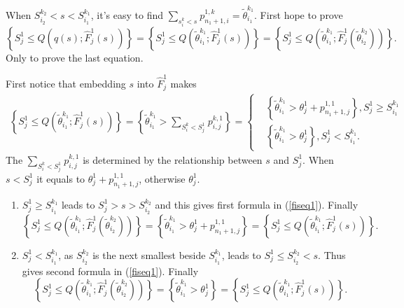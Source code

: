 \documentclass[12pt, a4paper, oneside]{article}
\begin{document}
    When $S_{i_2}^{k_2}<s<S_{i_1}^{k_1}$, it's easy to find $\overset{}{\underset{s_i^k<s}\sum}p_{n_1+1,i}^{1,k}=\tilde{\theta}_{i_1}^{k_1}$. First hope to prove
    \begin{equation}
        \left\{ S_j^1\leq Q(q(s);\hat{F}_j^1(s)) \right\}=\left\{ S_j^1\leq Q(\tilde{\theta}_{i_1}^{k_1};\hat{F}_j^1(s)) \right\}=\left\{ S_j^1\leq Q(\tilde{\theta}_{i_1}^{k_1};\hat{F}_j^1(\tilde{\theta}_{i_2}^{k_2})) \right\}.
    \end{equation}
    Only to prove the last equation.


    First notice that embedding $s$ into $\hat{F}_j^1$ makes
    \begin{gather}
        \left\{ S_j^1\leq Q(\tilde{\theta}_{i_1}^{k_1};\hat{F}_j^1(s)) \right\}=\left\{ \tilde{\theta}_{i_1}^{k_1}>\overset{}{\underset{S_i^k<S_j^1}\sum}p_{i,j}^{k,1} \right\}=\left\{
            \begin{aligned}
            &\left\{ \tilde{\theta}_{i_1}^{k_1}>\theta_j^1+p_{n_1+1,j}^{1,1} \right\},S_j^1\geq S_{i_1}^{k_1}\label{fiseq1}\\
            &\left\{ \tilde{\theta}_{i_1}^{k_1}>\theta_j^1 \right\},S_j^1<S_{i_1}^{k_1}.
            \end{aligned}
        \right.
    \end{gather}
    The $\overset{}{\underset{S_i^k<S_j^1}\sum}p_{i,j}^{k,1}$ is determined by the relationship between $s$ and $S_j^1$. When $s<S_j^1$ it equals to $\theta_j^1+p_{n_1+1,j}^{1,1}$, otherwise $\theta_j^1$.
    \begin{enumerate}
        \item $S_j^1\geq S_{i_1}^{k_1}$ leads to $S_j^1>s>S_{i_2}^{k_2}$ and this gives first formula in (\ref{fiseq1}). Finally
        \begin{equation*}
            \left\{ S_j^1\leq Q(\tilde{\theta}_{i_1}^{k_1};\hat{F}_j^1(\tilde{\theta}_{i_2}^{k_2})) \right\}=\left\{ \tilde{\theta}_{i_1}^{k_1}>\theta_j^1+p_{n_1+1,j}^{1,1} \right\}=\left\{ S_j^1\leq Q(\tilde{\theta}_{i_1}^{k_1};\hat{F}_j^1(s)) \right\}.
        \end{equation*}
        \item $S_j^1<S_{i_1}^{k_1}$, as $S_{i_2}^{k_2}$ is the next smallest beside $S_{i_1}^{k_1}$, leads to $S_j^1\leq S_{i_2}^{k_2}<s$. Thus gives second formula in (\ref{fiseq1}). Finally
        \begin{equation*}
            \left\{ S_j^1\leq Q(\tilde{\theta}_{i_1}^{k_1};\hat{F}_j^1(\tilde{\theta}_{i_2}^{k_2})) \right\}=\left\{ \tilde{\theta}_{i_1}^{k_1}>\theta_j^1 \right\}=\left\{ S_j^1\leq Q(\tilde{\theta}_{i_1}^{k_1};\hat{F}_j^1(s)) \right\}.
        \end{equation*}
    \end{enumerate}
\end{document}
